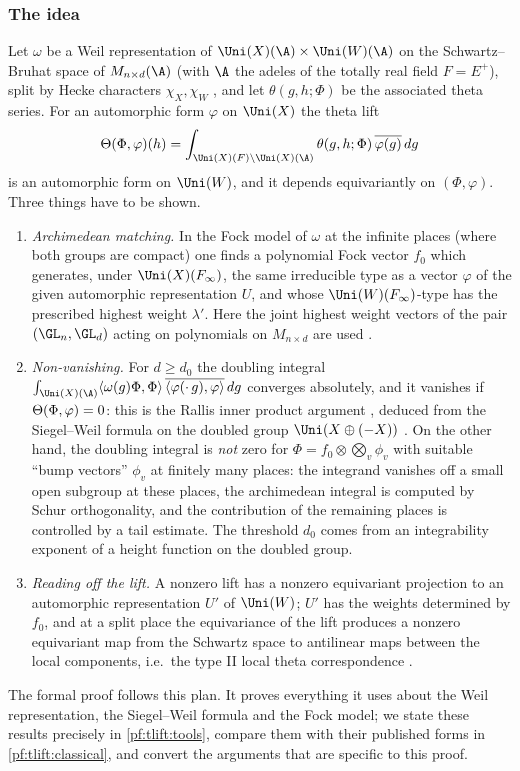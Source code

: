 \subsubsection*{The idea}
Let $\omega$ be a Weil representation of $\Uni(X)(\A)\times\Uni(W)(\A)$ on the Schwartz--Bruhat space of
$M_{n\times d}(\A)$ (with $\A$ the adeles of the totally real field $F=E^+$), split by Hecke
characters $\chi_X,\chi_W$ \cite{Weil1964,Kudla1994}, and let $\theta(g,h;\Phi)$ be the associated
theta series. For an automorphic form $\varphi$ on $\Uni(X)$ the theta lift
\[
  \tliftlift(\Phi,\varphi)(h)=\int_{\Uni(X)(F)\backslash\Uni(X)(\A)}\theta(g,h;\Phi)\,\overline{\varphi(g)}\,dg
\]
is an automorphic form on $\Uni(W)$, and it depends equivariantly on $(\Phi,\varphi)$. Three things have
to be shown.
\begin{enumerate}[label=(\arabic*),nosep]
\item \emph{Archimedean matching.} In the Fock model of $\omega$ at the infinite places (where both
  groups are compact) one finds a polynomial Fock vector $f_0$ which generates, under $\Uni(X)(F_\infty)$,
  the same irreducible type as a vector $\varphi$ of the given automorphic representation $U$, and whose
  $\Uni(W)(F_\infty)$-type has the prescribed highest weight $\lambda'$. Here the joint highest weight
  vectors of the pair $(\GL_n,\GL_d)$ acting on polynomials on $M_{n\times d}$ are used
  \cite{KashiwaraVergne1978,Howe1989}.
\item \emph{Non-vanishing.} For $d\ge d_0$ the doubling integral
  $\int_{\Uni(X)(\A)}\langle\omega(g)\Phi,\Phi\rangle\,\overline{\langle\varphi(\cdot\,g),\varphi\rangle}\,dg$ converges
  absolutely, and it vanishes if $\Theta(\Phi,\varphi)=0$: this is the Rallis inner product
  argument \cite{Rallis1984,PiatetskiShapiroRallis1987,Li1992}, deduced from the Siegel--Weil formula on the
  doubled group $\Uni(X\oplus(-X))$ \cite{Weil1965,KudlaRallis1988,Ichino2007}. On the other hand, the
  doubling integral is \emph{not} zero for $\Phi=f_0\otimes\bigotimes_v\phi_v$ with suitable ``bump
  vectors'' $\phi_v$ at finitely many places: the integrand vanishes off a small open subgroup at these
  places, the archimedean integral is computed by Schur orthogonality, and the contribution of the
  remaining places is controlled by a tail estimate. The threshold $d_0$ comes from an integrability
  exponent of a height function on the doubled group.
\item \emph{Reading off the lift.} A nonzero lift has a nonzero equivariant projection to an
  automorphic representation $U'$ of $\Uni(W)$; $U'$ has the weights determined by $f_0$, and at a split
  place the equivariance of the lift produces a nonzero equivariant map from the Schwartz space to
  antilinear maps between the local components, i.e.\ the type II local theta correspondence
  \cite{Minguez2008}.
\end{enumerate}
The formal proof \cite{LeanSource2026} follows this plan. It proves everything it uses about the Weil
representation, the Siegel--Weil formula and the Fock model; we state these results precisely in
\cref{pf:tlift:tools}, compare them with their published forms in \cref{pf:tlift:classical}, and convert the
arguments that are specific to this proof.

